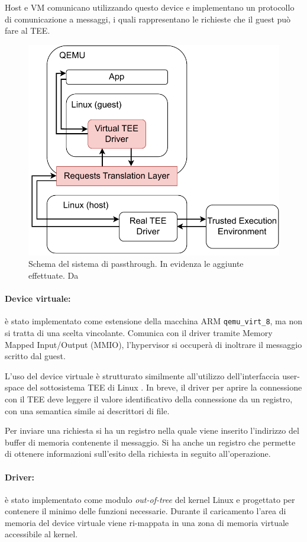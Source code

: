 \documentclass[12pt,italian]{report}
\begin{document}
	Host e VM comunicano utilizzando questo device e implementano un protocollo di comunicazione a messaggi, i quali rappresentano le richieste che il guest può fare al TEE.
	
	\begin{figure}[h]
		\centering
		\includegraphics[width=0.7\linewidth]{immagini/tee-passthrough-schema}
		\caption{
			Schema del sistema di passthrough. In evidenza le aggiunte effettuate. Da \cite{tesi_cutecchia}
		}
		\label{fig:passthrough-schema}
	\end{figure}
	
	\paragraph{Device virtuale:} è stato implementato come estensione della macchina ARM \texttt{qemu\_virt\_8}, ma non si tratta di una scelta vincolante. Comunica con il driver tramite Memory Mapped Input/Output (MMIO), l'hypervisor si occuperà di inoltrare il messaggio scritto dal guest.
	
	L'uso del device virtuale è strutturato similmente all'utilizzo dell'interfaccia user-space del sottosistema TEE di Linux \cite{linux_tee_subsystem}. In breve, il driver per aprire la connessione con il TEE deve leggere il valore identificativo della connessione da un registro, con una semantica simile ai descrittori di file. 
	
	Per inviare una richiesta si ha un registro nella quale viene inserito l'indirizzo del buffer di memoria contenente il messaggio. Si ha anche un registro che permette di ottenere informazioni sull'esito della richiesta in seguito all'operazione.
	
	\paragraph{Driver:} è stato implementato come modulo \textit{out-of-tree} del kernel Linux e progettato per contenere il minimo delle funzioni necessarie. Durante il caricamento l'area di memoria del device virtuale viene ri-mappata in una zona di memoria virtuale accessibile al kernel.
	
\end{document}
